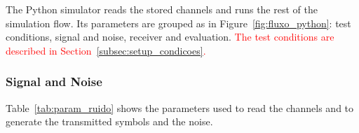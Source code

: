 The Python simulator reads the stored channels and runs the rest of the simulation flow. Its parameters are grouped as in Figure~\textcolor{red}{\ref{fig:fluxo_python}}: test conditions, signal and noise, receiver and evaluation. \textcolor{red}{The test conditions are described in Section~\ref{subsec:setup_condicoes}.}



\subsubsection{Signal and Noise}\label{subsec:setup_ruido}

Table~\ref{tab:param_ruido} shows the parameters used to read the channels and to generate the transmitted symbols and the noise.

